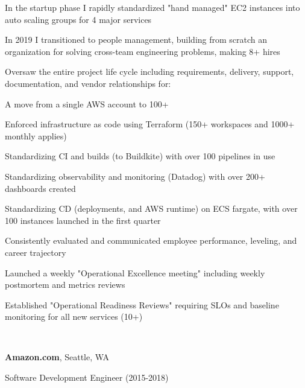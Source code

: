 \documentclass[letterpaper]{resume}
\begin{document}
\begin{compactitem}

\item In the startup phase I rapidly standardized "hand managed" EC2 instances
    into auto scaling groups for 4 major services
\item In 2019 I transitioned to people management, building from scratch an
    organization for solving cross-team engineering problems, making 8+ hires
\item Oversaw the entire project life cycle including requirements, delivery,
    support, documentation, and vendor relationships for:
    \begin{compactitem}
        \item A move from a single AWS account to 100+
        \item Enforced infrastructure as code using Terraform (150+ workspaces and 1000+ monthly applies)
        \item Standardizing CI and builds (to Buildkite) with over 100 pipelines in use
        \item Standardizing observability and monitoring (Datadog) with over 200+ dashboards created
        \item Standardizing CD (deployments, and AWS runtime) on ECS fargate,
            with over 100 instances launched in the first quarter
    \end{compactitem}
\item Consistently evaluated and communicated employee performance,
    leveling, and career trajectory
\item Launched a weekly "Operational Excellence meeting" including weekly
    postmortem and metrics reviews
\item Established "Operational Readiness Reviews" requiring SLOs and baseline
    monitoring for all new services (10+)
\end{compactitem}


~

\textbf{Amazon.com}, Seattle, WA

Software Development Engineer (2015-2018)
\end{document}
